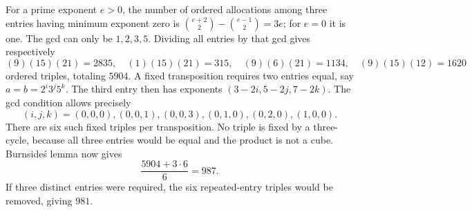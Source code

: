For a prime exponent $e>0$, the number of ordered allocations among three entries having minimum exponent zero is $\binom{e+2}2-\binom{e-1}2=3e$; for $e=0$ it is one. The gcd can only be $1,2,3,5$. Dividing all entries by that gcd gives respectively
\[
(9)(15)(21)=2835,\quad(1)(15)(21)=315,\quad(9)(6)(21)=1134,\quad(9)(15)(12)=1620
\]
ordered triples, totaling $5904$.
A fixed transposition requires two entries equal, say $a=b=2^i3^j5^k$. The third entry then has exponents $(3-2i,5-2j,7-2k)$. The gcd condition allows precisely
\[
(i,j,k)=(0,0,0),(0,0,1),(0,0,3),(0,1,0),(0,2,0),(1,0,0).
\]
There are six such fixed triples per transposition. No triple is fixed by a three-cycle, because all three entries would be equal and the product is not a cube. Burnside\'s lemma now gives
\[
\boxed{\dfrac{5904+3\cdot6}{6}=987}.
\]
If three distinct entries were required, the six repeated-entry triples would be removed, giving $981$.

